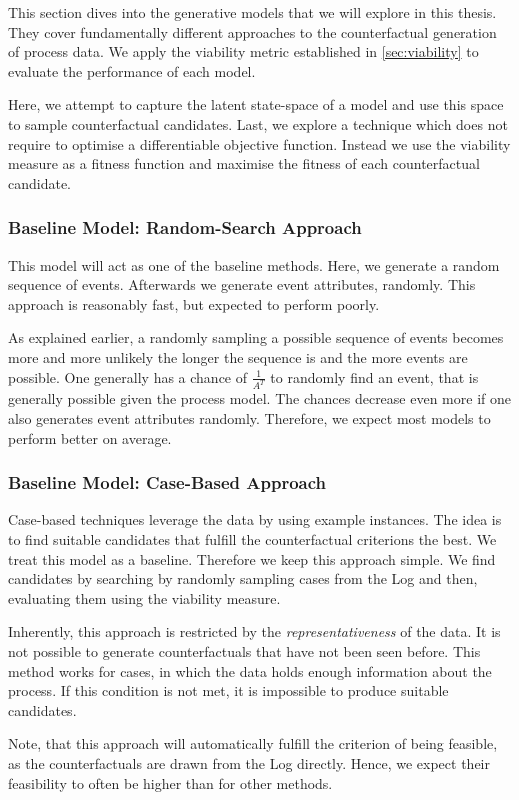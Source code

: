 \documentclass[./../../paper.tex]{subfiles}
\begin{document}
This section dives into the generative models that we will explore in this thesis. They cover fundamentally different approaches to the counterfactual generation of process data. We apply the viability metric established in \autoref{sec:viability} to evaluate the performance of each model.


Here, we attempt to capture the latent state-space of a model and use this space to sample counterfactual candidates.  Last, we explore a technique which does not require to optimise a differentiable objective function. Instead we use the viability measure as a fitness function and maximise the fitness of each counterfactual candidate.



\subsubsection{Baseline Model: Random-Search Approach}
This model will act as one of the baseline methods. Here, we generate a random sequence of events. Afterwards we generate event attributes, randomly. This approach is reasonably fast, but expected to perform poorly.

As explained earlier, a randomly sampling a possible sequence of events becomes more and more unlikely the longer the sequence is and the more events are possible. One generally has a chance of $\frac{1}{A^T}$ to randomly find an event, that is generally possible given the process model. The chances decrease even more if one also generates event attributes randomly. Therefore, we expect most models to perform better on average.


\subsubsection{Baseline Model: Case-Based Approach}
Case-based techniques leverage the data by using example instances. The idea is to find suitable candidates that fulfill the counterfactual criterions the best. We treat this model as a baseline. Therefore we keep this approach simple. We find candidates by searching by randomly sampling cases from the Log and then, evaluating them using the viability measure.

Inherently, this approach is restricted by the \emph{representativeness} of the data. It is not possible to generate counterfactuals that have not been seen before. This method works for cases, in which the data holds enough information about the process. If this condition is not met, it is impossible to produce suitable candidates.

Note, that this approach will automatically fulfill the criterion of being feasible, as the counterfactuals are drawn from the Log directly. Hence, we expect their feasibility to often be higher than for other methods.
\end{document}
